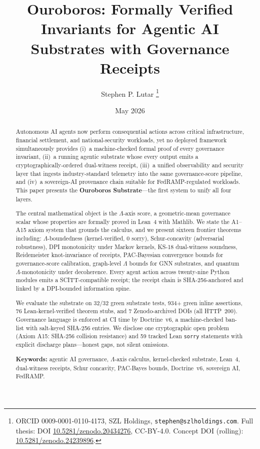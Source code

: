 \documentclass[11pt,letterpaper]{article}
\title{Ouroboros: Formally Verified Invariants for Agentic AI Substrates
       with Governance Receipts}
\author{Stephen P. Lutar%
  \thanks{ORCID 0009-0001-0110-4173, SZL Holdings,
          \texttt{stephen@szlholdings.com}.
          Full thesis: DOI \href{https://doi.org/10.5281/zenodo.20434276}%
          {10.5281/zenodo.20434276}, CC-BY-4.0.
          Concept DOI (rolling):
          \href{https://doi.org/10.5281/zenodo.24239896}%
          {10.5281/zenodo.24239896}.}}
\date{May 2026}
\theoremstyle{definition}
\theoremstyle{remark}
\begin{document}
\maketitle

\begin{abstract}
Autonomous AI agents now perform consequential actions across
critical infrastructure, financial settlement, and national-security
workloads, yet no deployed framework simultaneously provides
(i)~a machine-checked formal proof of every governance invariant,
(ii)~a running agentic substrate whose every output emits a
cryptographically-ordered dual-witness receipt,
(iii)~a unified observability and security layer that ingests
industry-standard telemetry into the same governance-score pipeline,
and (iv)~a sovereign-AI provenance chain suitable for FedRAMP-regulated
workloads.
This paper presents the \textbf{Ouroboros Substrate}---the first system
to unify all four layers.

The central mathematical object is the \(\Lambda\)-axis score, a
geometric-mean governance scalar whose properties are formally proved in
Lean~4 with Mathlib.
We state the A1--A15 axiom system that grounds the calculus, and we
present sixteen frontier theorems including:
\(\Lambda\)-boundedness (kernel-verified, 0 sorry),
Schur-concavity (adversarial robustness),
DPI monotonicity under Markov kernels,
KS-18 dual-witness soundness,
Reidemeister knot-invariance of receipts,
PAC-Bayesian convergence bounds for governance-score calibration,
graph-level \(\Lambda\) bounds for GNN substrates,
and quantum \(\Lambda\)-monotonicity under decoherence.
Every agent action across twenty-nine Python modules emits a
SCITT-compatible receipt; the receipt chain is SHA-256-anchored and
linked by a DPI-bounded information spine.

We evaluate the substrate on 32/32 green substrate tests, 934+ green
inline assertions, 76 Lean-kernel-verified theorem stubs, and 7
Zenodo-archived DOIs (all HTTP~200).
Governance language is enforced at CI time by Doctrine~v6, a
machine-checked ban-list with salt-keyed SHA-256 entries.
We disclose one cryptographic open problem (Axiom A15: SHA-256
collision resistance) and 59 tracked Lean \texttt{sorry} statements with
explicit discharge plans---honest gaps, not silent omissions.

\medskip
\noindent\textbf{Keywords:} agentic AI governance, \(\Lambda\)-axis
calculus, kernel-checked substrate, Lean~4, dual-witness receipts,
Schur concavity, PAC-Bayes bounds, Doctrine~v6, sovereign AI, FedRAMP.
\end{abstract}
\end{document}
